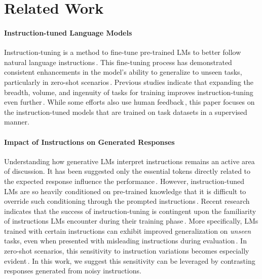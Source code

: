 \vspace{-8pt}
\section{Related Work}

\paragraph{Instruction-tuned Language Models}
Instruction-tuning is a method to fine-tune pre-trained LMs to better follow natural language instructions\,\citep{flan, t0}. This fine-tuning process has demonstrated consistent enhancements in the model's ability to generalize to unseen tasks, particularly in zero-shot scenarios\,\citep{alpaca, wizardlm, sni_dataset, instruction_tuning_with_gpt4, instruct_gpt, flan_t5}. Previous studies indicate that expanding the breadth, volume, and ingenuity of tasks for training improves instruction-tuning even further\,\citep{sni_dataset, self_instruct, how_far_can_camels_go}. While some efforts also use human feedback\,\citep{instruct_gpt, fingrained_human_feedback, finetuning_lms_human_preferences, pro_human_feedback}, this paper focuses on the instruction-tuned models that are trained on task datasets in a supervised manner.

\paragraph{Impact of Instructions on Generated Responses}
Understanding how generative LMs interpret instructions remains an active area of discussion. It has been suggested only the essential tokens directly related to the expected response influence the performance\,\citep{did_you_read_instructions}. However, instruction-tuned LMs are so heavily conditioned on pre-trained knowledge that it is difficult to override such conditioning through the prompted instructions\,\citep{instruction_verbalizer_manipulation, llm_counterfactual_tasks}. 
Recent research indicates that the success of instruction-tuning is contingent upon the familiarity of instructions LMs encounter during their training phase\,\citep{instructeval, formatting_consistency}. More specifically, LMs trained with certain instructions can exhibit improved generalization on \textit{unseen} tasks, even when presented with misleading instructions during evaluation\,\citep{evaluating_robustness_instruction_tuned, do_really_follows_instructions}. In zero-shot scenarios, this sensitivity to instruction variations becomes especially evident\,\citep{evaluating_robustness_instruction_tuned, robustness_task_instructions}. In this work, we suggest this sensitivity can be leveraged by contrasting responses generated from noisy instructions.

